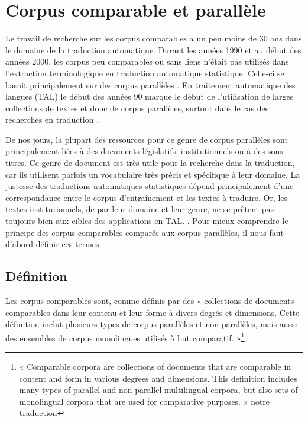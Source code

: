 \chapter{Corpus comparable et parallèle}

Le travail de recherche sur les corpus comparables a un peu moins de {30 ans} dans le domaine de la
traduction automatique. Durant les années 1990 et au début des années 2000, les corpus peu comparables ou sans liens n'était pas utilisés
dans l'extraction terminologique en traduction automatique statistique. Celle-ci se basait principalement sur des corpus parallèles \citep{sharoff_2013a}.
En traitement automatique des langues (TAL) le début des années 90 marque le début de l'utilisation de
larges collections de textes et donc de corpus parallèles, surtout dans le cas des recherches en
traduction \citep{sharoff_2013a}.

De nos jours, la plupart des ressources pour ce genre de corpus parallèles sont principalement
liées à des documents législatifs, institutionnels ou à des sous-titres. Ce genre de document est très utile pour la
recherche dans la traduction, car ils utilisent parfois un vocabulaire très précis et spécifique à
leur domaine. La justesse des traductions automatiques statistiques dépend
principalement d'une correspondance entre le corpus d'entraînement et les textes à traduire. Or, les textes institutionnels,
de par leur domaine et leur genre, ne se prêtent pas toujours bien aux cibles des applications en TAL.
\citep{babych_2007, eisele_2008, sharoff_2013a}.
Pour mieux comprendre le principe des corpus comparables comparés aux corpus parallèles, il nous faut
d'abord définir ces termes.

\newpage

\section{Définition}

Les corpus comparables sont, comme définis par \citet{sharoff_2013b} des {« }collections de documents
comparables dans leur contenu et leur forme à divers degrés et dimensions. Cette définition inclut
plusieurs types de corpus parallèles et non-parallèles, mais aussi des ensembles de corpus monolingues
utilisés à but comparatif.{ »}\footnote{{« }Comparable corpora are collections of documents that are comparable
in content and form in various degrees and dimensions. This definition includes many types of parallel and
non-parallel multilingual corpora, but also sets of monolingual corpora that are used for comparative
purposes.{ »} \citep{sharoff_2013b} notre traduction}

